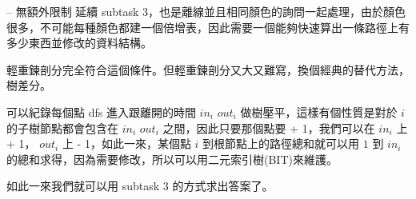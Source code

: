 \documentclass[hyperref,UTF8,notheorems,xcolor={dvipsnames}]{beamer}
\newcommand{\btitle}[1]{{\secname} -- #1}
\theoremstyle{definition}
\begin{document}
\begin{frame}[fragile]{\btitle{無額外限制}}
	延續 subtask 3，也是離線並且相同顏色的詢問一起處理，由於顏色很多，不可能每種顏色都建一個倍增表，因此需要一個能夠快速算出一條路徑上有多少東西並修改的資料結構。
	\pause

	輕重鍊剖分完全符合這個條件。但輕重鍊剖分又大又難寫，換個經典的替代方法，樹差分。
	\pause
	
	可以紀錄每個點 dfs 進入跟離開的時間 $in_i$ $out_i$ 做樹壓平，這樣有個性質是對於 $i$ 的子樹節點都會包含在 $in_i$ $out_i$ 之間，因此只要那個點要 + 1，我們可以在 $in_i$ 上 + 1， $out_i$ 上 - 1，如此一來，某個點 $i$ 到根節點上的路徑總和就可以用 $1$ 到 $in_i$ 的總和求得，因為需要修改，所以可以用二元索引樹(BIT)來維護。

	如此一來我們就可以用 subtask 3 的方式求出答案了。
\end{frame}
\end{document}
